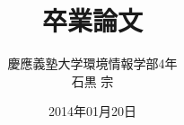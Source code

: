 \documentclass[11pt,a4paper]{jsarticle}
\begin{document}
\title{卒業論文}
\author{慶應義塾大学環境情報学部4年\\石黒 宗}
\date{2014年01月20日}

\maketitle
\end{document}
